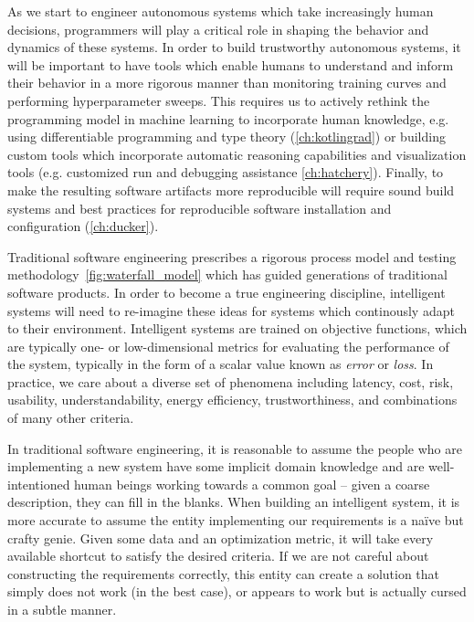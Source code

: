 As we start to engineer autonomous systems which take increasingly human decisions, programmers will play a critical role in shaping the behavior and dynamics of these systems. In order to build trustworthy autonomous systems, it will be important to have tools which enable humans to understand and inform their behavior in a more rigorous manner than monitoring training curves and performing hyperparameter sweeps. This requires us to actively rethink the programming model in machine learning to incorporate human knowledge, e.g. using differentiable programming and type theory (\autoref{ch:kotlingrad}) or building custom tools which incorporate automatic reasoning capabilities and visualization tools (e.g. customized run and debugging assistance \autoref{ch:hatchery}). Finally, to make the resulting software artifacts more reproducible will require sound build systems and best practices for reproducible software installation and configuration (\autoref{ch:ducker}).

Traditional software engineering prescribes a rigorous process model and testing methodology~\autoref{fig:waterfall_model} which has guided generations of traditional software products. In order to become a true engineering discipline, intelligent systems will need to re-imagine these ideas for systems which continously adapt to their environment. Intelligent systems are trained on objective functions, which are typically one- or low-dimensional metrics for evaluating the performance of the system, typically in the form of a scalar value known as \textit{error} or \textit{loss}. In practice, we care about a diverse set of phenomena including latency, cost, risk, usability, understandability, energy efficiency, trustworthiness, and combinations of many other criteria.

In traditional software engineering, it is reasonable to assume the people who are implementing a new system have some implicit domain knowledge and are well-intentioned human beings working towards a common goal -- given a coarse description, they can fill in the blanks. When building an intelligent system, it is more accurate to assume the entity implementing our requirements is a na\"ive but crafty genie. Given some data and an optimization metric, it will take every available shortcut to satisfy the desired criteria. If we are not careful about constructing the requirements correctly, this entity can create a solution that simply does not work (in the best case), or appears to work but is actually cursed in a subtle manner.

